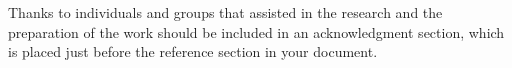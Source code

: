 \documentclass[sigconf, 11pt,urlbreakonhyphens=true,balance=true,manuscript,nonacm]{acmart}
\begin{document}





\begin{acks}
Thanks to individuals and groups that assisted in the research and the preparation of the work should be included in an acknowledgment section, which is placed just before the reference section in your
document.
\end{acks}





\appendix

\end{document}
